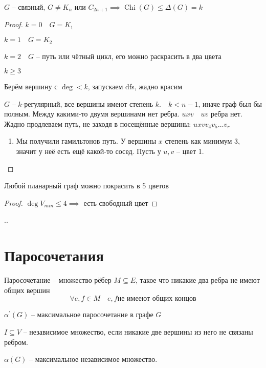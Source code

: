 \documentclass{book}
\newcommand{\p}[1]{#1^{\prime}}
\theoremstyle{definition}
\DeclareMathOperator{\Chi}{Chi}
\begin{document}
\begin{theorem}
    [Брукс]

    $G$ -- связный,  $G\neq K_n$ или $C_{2n+1} \implies \Chi(G) \leqslant \Delta(G) = k$
\end{theorem}
\begin{proof}
    $k = 0\quad G = K_1$

    $k = 1\quad G = K_2$

    $k=2\quad G$ -- путь или чётный цикл, его можно раскрасить в два цвета

     $k\geqslant 3$

     Берём вершину с $\deg < k$, запускаем dfs, жадно красим

     $G$ --  $k$-регулярный, все вершины имеют степень  $k.\quad k < n-1$, иначе граф был бы полным. Между какими-то двумя вершинами нет ребра.  $uxv\quad uv$ ребра нет. Жадно продлеваем путь, не заходя в посещённые вершины:  $uxv v_4 v_5 \ldots v_r$
     \begin{enumerate}
         \item Мы получили гамильтонов путь. У вершины $x$ степень как минимум 3, значит у неё есть ещё какой-то сосед. Пусть у  $u,v$ -- цвет 1.
     \end{enumerate}
\end{proof}

\begin{statement}
    Любой планарный граф можно покрасить в 5 цветов
\end{statement}
\begin{proof}
    $\deg V_{min}\leqslant 4 \implies $ есть свободный цвет
\end{proof}

\begin{theorem}
..    
\end{theorem}

\section{Паросочетания}

\begin{definition}
    Паросочетание -- множество рёбер $M\subseteq E$, такое что никакие два ребра не имеют общих вершин \[\forall e, f\in M\quad e, f \text{не имееют общих концов}\]

    $\p \alpha(G)$ -- максимальное паросочетание в графе  $G$
\end{definition}

\begin{definition}
    $I \subseteq V$ -- независимое множество, если никакие две вершины из него не связаны ребром.

    $\alpha(G)$ -- максимальное независимое множество.
\end{definition}
\end{document}
